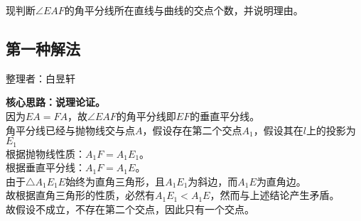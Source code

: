 \documentclass[UTF8]{ctexart}
\begin{document}
    现判断$\angle EAF$的角平分线所在直线与曲线的交点个数，并说明理由。

\newpage

\subsection{第一种解法}
    \begin{center}
        整理者：白昱轩
    \end{center}
    {
        \small
        \textbf{核心思路：说理论证。}\\[5mm]
        因为$EA=FA$，故$\angle EAF$的角平分线即$EF$的垂直平分线。\\[5mm]
        角平分线已经与抛物线交与点$A$，假设存在第二个交点$A_1$，假设其在$l$上的投影为$E_1$\\[5mm]
        根据抛物线性质：$A_1F=A_1E_1$。\\[5mm]
        根据垂直平分线：$A_1F=A_1E$。\\[5mm]
        由于$\triangle A_1E_1E$始终为直角三角形，且$A_1E_1$为斜边，而$A_1E$为直角边。\\[5mm]
        故根据直角三角形的性质，必然有$A_1E_1<A_1E$，然而与上述结论产生矛盾。\\[5mm]
        故假设不成立，不存在第二个交点，因此只有一个交点。\vspace{2pt}
    }
\end{document}

